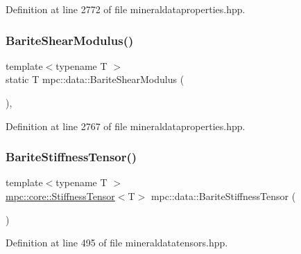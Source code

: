 Definition at line 2772 of file mineraldataproperties.\+hpp.

\mbox{\label{namespacempc_1_1data_aad72eac174ca49c18334f20df5179100}} 
\subsubsection{\texorpdfstring{Barite\+Shear\+Modulus()}{BariteShearModulus()}}
{\footnotesize\ttfamily template$<$typename T $>$ \\
static T mpc\+::data\+::\+Barite\+Shear\+Modulus (\begin{DoxyParamCaption}{ }\end{DoxyParamCaption})\hspace{0.3cm}{\ttfamily [inline]}, {\ttfamily [static]}}



Definition at line 2767 of file mineraldataproperties.\+hpp.

\mbox{\label{namespacempc_1_1data_ac27134c807fbc4fc1000e5c897ad40c4}} 
\subsubsection{\texorpdfstring{Barite\+Stiffness\+Tensor()}{BariteStiffnessTensor()}}
{\footnotesize\ttfamily template$<$typename T $>$ \\
\mbox{\hyperlink{structmpc_1_1core_1_1_stiffness_tensor}{mpc\+::core\+::\+Stiffness\+Tensor}}$<$T$>$ mpc\+::data\+::\+Barite\+Stiffness\+Tensor (\begin{DoxyParamCaption}{ }\end{DoxyParamCaption})}



Definition at line 495 of file mineraldatatensors.\+hpp.

\mbox{\label{namespacempc_1_1data_ae9501fd6b7747a04f6af41111a43274c}} 
